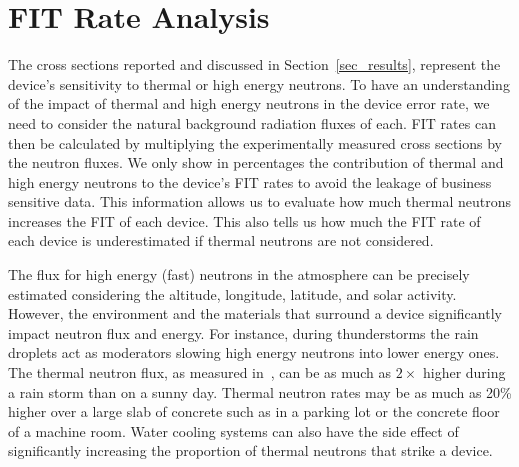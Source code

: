 


\section{FIT Rate Analysis}
\label{sec_fit}


The cross sections reported and discussed in Section~\ref{sec_results}, represent the device's sensitivity to thermal or high energy neutrons. To have an understanding of the impact of thermal and high energy neutrons in the device error rate, we need to consider the natural background radiation fluxes of each. FIT rates can then be calculated by multiplying the experimentally measured cross sections by the neutron fluxes. We only show in percentages the contribution of thermal and high energy neutrons to the device's FIT rates to avoid the leakage of business sensitive data. This information allows us to evaluate how much thermal neutrons increases the FIT of each device. This also tells us how much the FIT rate of each device is underestimated if thermal neutrons are not considered.


\label{sub_flux}

The flux for high energy (fast) neutrons in the atmosphere can be precisely estimated considering the
altitude, longitude, latitude, and solar activity. However, the environment and the materials that surround a device significantly impact neutron flux and energy. 
For instance, during thunderstorms the rain droplets act as moderators slowing high
energy neutrons into lower energy ones. The thermal neutron flux, as measured
in~\cite{ziegler2003}, can be as much as $2\times$ higher during a rain storm than on a sunny day. Thermal neutron rates may be as much as 20\% higher over a large slab of concrete such as in a parking lot or the concrete floor of a machine room. 
Water cooling systems can also have the side effect of significantly 
increasing the proportion of thermal neutrons that strike a device.

